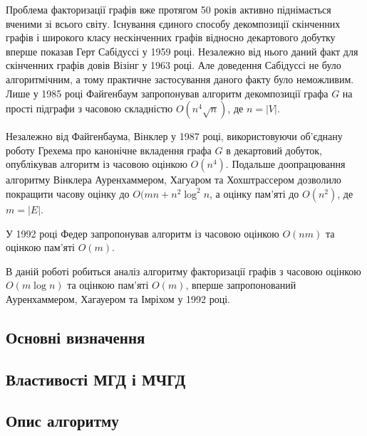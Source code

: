 Проблема факторизації графів вже протягом 50 років активно піднімається вченими зі всього світу.
Існування єдиного способу декомпозиції скінченних графів і широкого класу нескінченних графів відносно декартового добутку вперше показав Герт Сабідуссі у 1959 році\cite{sabidussi1959gm}.
Незалежно від нього даний факт для скінченних графів довів Візінг у 1963 році\cite{vizing1963cpf}.
Але доведення Сабідуссі не було алгоритмічним, а тому практичне застосування даного факту було неможливим.
Лише у 1985 році Файгенбаум запропонував алгоритм декомпозиції графа $G$ на прості підграфи з часовою складністю $O(n^4\sqrt n)$, де $n=\vert V \vert$\cite{feigenbaum1985ptafpfcpg}.

Незалежно від Файгенбаума, Вінклер у 1987 році, використовуючи об'єднану роботу Грехема про канонічне вкладення графа $G$ в декартовий добуток, опублікував алгоритм із часовою оцінкою $O(n^4)$.
Подальше доопрацювання алгоритму Вінклера Ауренхаммером, Хагуаром та Хох\-штрассером дозволило покращити часову оцінку до $O(mn+n^2\log^2n$, а оцінку пам'яті до $O(n^2)$, де $m=\vert E \vert$.

У 1992 році Федер запропонував алгоритм із часовою оцінкою $O(nm)$ та оцінкою пам'яті $O(m)$\cite{feder1992pgr}.

В даній роботі робиться аналіз алгоритму факторизації графів з часовою оцінкою $O(m\log n)$ та оцінкою пам'яті $O(m)$, вперше запропонований Ауренхаммером, Хагауером та Імріхом у 1992 році\cite{aurenhammer1992cgflce}.

\newpage
\subsection{Основні визначення}


\newpage
\subsection{Властивості МГД і МЧГД}


\newpage
\subsection{Опис алгоритму}


